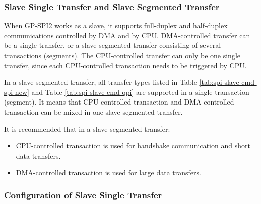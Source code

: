 \documentclass[main\_\_EN.tex]{subfiles}
\begin{document}
\subsubsection{Slave Single Transfer and Slave Segmented Transfer}\label{para:spi-slave-seg-trans}

When GP-SPI2 works as a slave, it supports full-duplex and half-duplex communications controlled by DMA and by CPU. DMA-controlled transfer can be a single transfer, or a slave segmented transfer consisting of several transactions (segments). The CPU-controlled transfer can only be one single transfer, since each CPU-controlled transaction needs to be triggered by CPU.

In a slave segmented transfer, all transfer types listed in Table \ref{tab:spi-slave-cmd-spi-new} and Table \ref{tab:spi-slave-cmd-qpi} are supported in a single transaction (segment). It means that CPU-controlled transaction and DMA-controlled transaction can be mixed in one slave segmented transfer.

It is recommended that in a slave segmented transfer:

\begin{itemize}
    \item CPU-controlled transaction is used for handshake communication and short data transfers.

    \item  DMA-controlled transaction is used for large data transfers.
\end{itemize}

\subsubsection{Configuration of Slave Single Transfer}\label{para:spi-slave-single-transfer-config}
\end{document}
